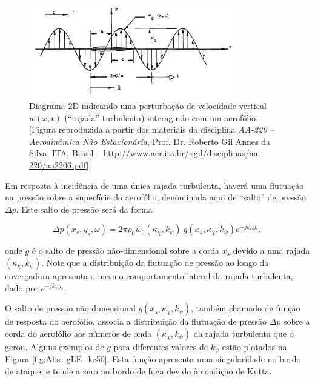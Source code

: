 \documentclass[a4paper, 11pt, twoside]{article}
\begin{document}
\begin{figure}[htbp]
	\centering
	\includegraphics[width=0.8\textwidth]{../figures/gust_ProfGil_ITA_aula06.jpg}
	\caption{Diagrama 2D indicando uma perturbação de velocidade vertical $w(x, t)$ (``rajada'' turbulenta) interagindo com um aerofólio. [Figura reproduzida a partir dos materiais da disciplina \emph{AA-220 -- Aerodinâmica Não Estacionária}, Prof. Dr. Roberto Gil Annes da Silva, ITA, Brasil -- \url{http://www.aer.ita.br/~gil/disciplinas/aa-220/aa2206.pdf}].}
	\label{fig:gust_airfoil_2D}
\end{figure}


Em resposta à incidência de uma única rajada turbulenta, haverá uma flutuação na pressão sobre a superfície do aerofólio, denominada aqui de ``salto'' de pressão $\Delta p$. Este salto de pressão será da forma

\begin{equation}
\Delta p(x_s, y_s, \omega) =  2 \pi \rho_0 \hat{w}_0(\kappa_\chi, k_\psi) \ g(x_s, \kappa_\chi, k_\psi) e^{-j k_\psi y_s},
\label{eq:DeltaP_SingleGust}
\end{equation}

\noindent onde $g$ é o salto de pressão não-dimensional sobre a corda $x_s$ devido a uma rajada $(\kappa_\chi, k_\psi)$. Note que a distribuição da flutuação de pressão ao longo da envergadura apresenta o mesmo comportamento lateral da rajada turbulenta, dado por $e^{-j k_\psi y_s}$.

O salto de pressão não dimensional $g(x_s, \kappa_\chi, k_\psi)$, também chamado de função de resposta do aerofólio, associa a distribuição da flutuação de pressão $\Delta p$ sobre a corda do aerofólio aos números de onda $(\kappa_\chi, k_\psi)$ da rajada turbulenta que o gerou. Alguns exemplos de $g$ para diferentes valores de $k_\psi$ estão plotados na Figura \ref{fig:Abs_gLE_kc50}. Esta função apresenta uma singularidade no bordo de ataque, e tende a zero no bordo de fuga devido à condição de Kutta.
\end{document}

